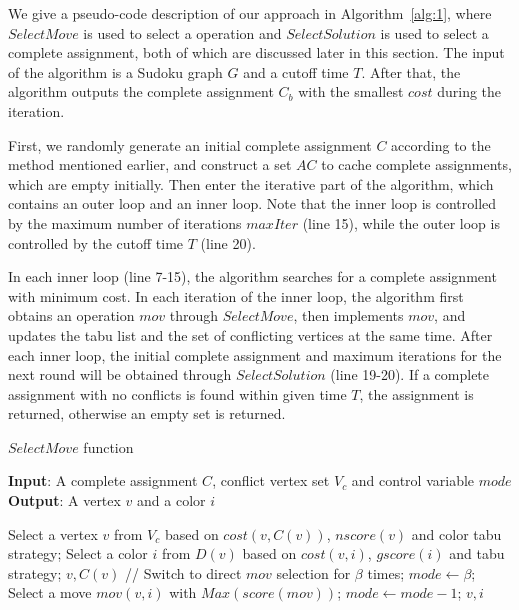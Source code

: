 \documentclass{article}
\begin{document}
We give a pseudo-code description of our approach in Algorithm~\ref{alg:1}, where $SelectMove$ is used to select a operation and $SelectSolution$ is used to select a complete assignment, both of which are discussed later in this section. The input of the algorithm is a Sudoku graph $G$ and a cutoff time $T$. After that, the algorithm outputs the complete assignment $C_b$ with the smallest $cost$ during the iteration. 

First, we randomly generate an initial complete assignment $C$ according to the method mentioned earlier, and construct a set $AC$ to cache complete assignments, which are empty initially. Then enter the iterative part of the algorithm, which contains an outer loop and an inner loop. Note that the inner loop is controlled by the maximum number of iterations $maxIter$ (line 15), while the outer loop is controlled by the cutoff time $T$ (line 20).

In each inner loop (line 7-15), the algorithm searches for a complete assignment with minimum cost. In each iteration of the inner loop, the algorithm first obtains an operation $mov$ through $SelectMove$, then implements $mov$, and updates the tabu list and the set of conflicting vertices at the same time. After each inner loop, the initial complete assignment and maximum iterations for the next round will be obtained through $SelectSolution$ (line 19-20). If a complete assignment with no conflicts is found within given time $T$, the assignment is returned, otherwise an empty set is returned.

\begin{algorithm}[t]
    \caption{$SelectMove$ function}
    \label{alg:2}
    \textbf{Input}: A complete assignment $C$, conflict vertex set $V_c$ and control variable $mode$\\
    \textbf{Output}: A vertex $v$ and a color $i$
    \begin{algorithmic}[1] %
        \STATE Select a vertex $v$ from $V_c$ based on $cost(v, C(v))$, $nscore(v)$ and color tabu strategy; 
        \STATE Select a color $i$ from $D(v)$ based on $cost(v, i)$, $gscore(i)$ and tabu strategy;
        \RETURN $v, C(v)$
        \ELSE
        \STATE // Switch to direct $mov$ selection for $\beta$ times; 
        \STATE $mode \leftarrow \beta$; 
        \ENDIF
        \ENDIF
        \ELSE
        \STATE Select a move $mov(v,i)$ with $Max(score(mov))$; 
        \STATE $mode \leftarrow mode - 1$;
        \ENDIF
        \RETURN $v, i$
    \end{algorithmic}
\end{algorithm}
\end{document}
